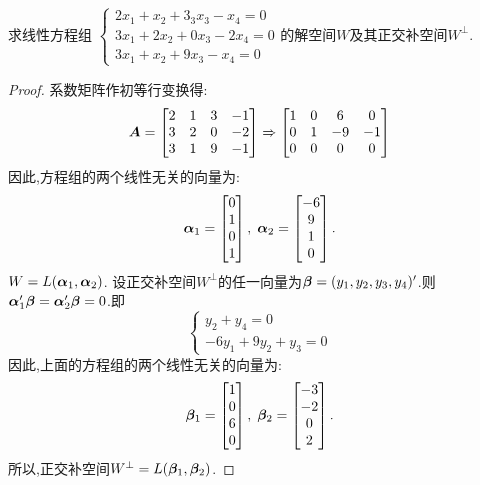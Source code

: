 \documentclass[lang=cn,11pt,normal]{elegantbook}
\begin{document}
	\begin{exercise}
		求线性方程组
		$
		\begin{cases}
		2x_1+x_2+3_3x_3-x_4=0\\
		3x_1+2x_2+0x_3-2x_4=0\\
		3x_1+x_2+9x_3-x_4=0
		\end{cases}
		$的解空间$W$及其正交补空间$W^{\perp}$.
	\end{exercise}
	\begin{proof}
		系数矩阵作初等行变换得:
		\begin{equation}
		\AA=
		\begin{bmatrix}
		2&1&3&-1\\
		3&2&0&-2\\
		3&1&9&-1
		\end{bmatrix}
		\xRightarrow{}
		\begin{bmatrix}
		1&0&6&0\\
		0&1&-9&-1\\
		0&0&0&0
		\end{bmatrix}
		\end{equation}
		因此,方程组的两个线性无关的向量为:
		\begin{equation}
		\bfaf_1=
		\begin{bmatrix}
		0\\1\\0\\1
		\end{bmatrix},\;
		\bfaf_2=
		\begin{bmatrix}
		-6\\9\\1\\0
		\end{bmatrix}.
		\end{equation}
		$W=L(\bfaf_1,\bfaf_2)$.
		设正交补空间$W^\perp$的任一向量为$\bfbt=(y_1,y_2,y_3,y_4)'$.则$\bfaf_1'\bfbt=\bfaf_2'\bfbt=0$.即
		\begin{equation}
		\begin{cases}
		y_2+y_4=0\\
		-6y_1+9y_2+y_3=0
		\end{cases}
		\end{equation}
		因此,上面的方程组的两个线性无关的向量为:
		\begin{equation}
		\bfbt_1=
		\begin{bmatrix}
		1\\0\\6\\0
		\end{bmatrix},\;
		\bfbt_2=
		\begin{bmatrix}
		-3\\-2\\0\\2
		\end{bmatrix}.
		\end{equation}
		所以,正交补空间$W^\perp=L(\bfbt_1,\bfbt_2)$.
	\end{proof}
\end{document}
